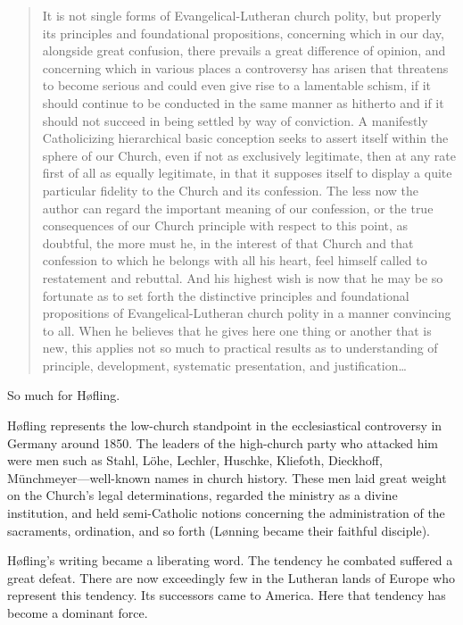 \begin{quote}
It is not single forms of Evangelical-Lutheran church polity, but properly its principles and foundational propositions, concerning which in our day, alongside great confusion, there prevails a great difference of opinion, and concerning which in various places a controversy has arisen that threatens to become serious and could even give rise to a lamentable schism, if it should continue to be conducted in the same manner as hitherto and if it should not succeed in being settled by way of conviction. A manifestly Catholicizing hierarchical basic conception seeks to assert itself within the sphere of our Church, even if not as exclusively legitimate, then at any rate first of all as equally legitimate, in that it supposes itself to display a quite particular fidelity to the Church and its confession. The less now the author can regard the important meaning of our confession, or the true consequences of our Church principle with respect to this point, as doubtful, the more must he, in the interest of that Church and that confession to which he belongs with all his heart, feel himself called to restatement and rebuttal. And his highest wish is now that he may be so fortunate as to set forth the distinctive principles and foundational propositions of Evangelical-Lutheran church polity in a manner convincing to all. When he believes that he gives here one thing or another that is new, this applies not so much to practical results as to understanding of principle, development, systematic presentation, and justification…
\end{quote}

So much for Høfling.

Høfling represents the low-church standpoint in the ecclesiastical controversy in Germany around 1850. The leaders of the high-church party who attacked him were men such as Stahl, Löhe, Lechler, Huschke, Kliefoth, Dieckhoff, Münchmeyer—well-known names in church history. These men laid great weight on the Church’s legal determinations, regarded the ministry as a divine institution, and held semi-Catholic notions concerning the administration of the sacraments, ordination, and so forth (Lønning became their faithful disciple).

Høfling’s writing became a liberating word. The tendency he combated suffered a great defeat. There are now exceedingly few in the Lutheran lands of Europe who represent this tendency. Its successors came to America. Here that tendency has become a dominant force.
